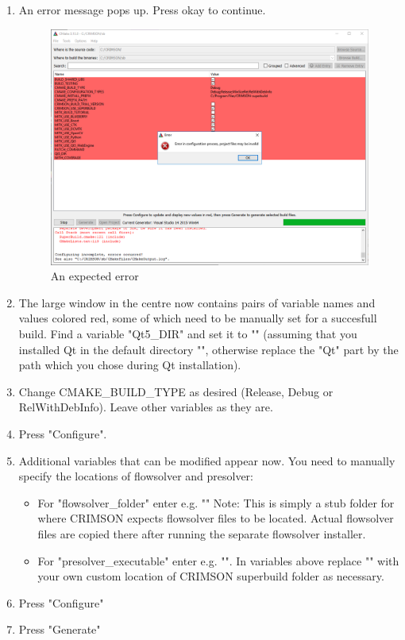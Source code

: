 \documentclass[]{scrartcl}
\begin{document}
\begin{enumerate}
	\item An error message pops up. Press okay to continue.
	
	\begin{figure}[H]
		\centering
		\includegraphics[width=0.8\linewidth]{Images/cmake3}
		\caption{An expected error}
		\label{fig:cmake3}
	\end{figure}
	\item The large window in the centre now contains pairs of variable names and values colored red, some of which need to be manually set for a succesfull build. Find a variable "Qt5\_DIR" and set it to "" (assuming that you installed Qt in the default directory "", otherwise replace the "Qt" part by the path which you chose during Qt installation).
	\item Change CMAKE\_BUILD\_TYPE as desired (Release, Debug or RelWithDebInfo). Leave other variables as they are.
	\item Press "Configure".
	\item Additional variables that can be modified appear now. You need to manually specify the locations of flowsolver and presolver:
	\begin{itemize}
		\item For "flowsolver\_folder" enter e.g. ""
		\linebreak Note: This is simply a stub folder for where CRIMSON expects flowsolver files to be located. Actual flowsolver files are copied there after running the separate flowsolver installer.
		\item For "presolver\_executable" enter e.g. "".
		In variables above replace "" with your own custom location of CRIMSON superbuild folder as necessary.
	\end{itemize}

	\item Press "Configure"
	\item Press "Generate"
	
\end{enumerate}
\end{document}
